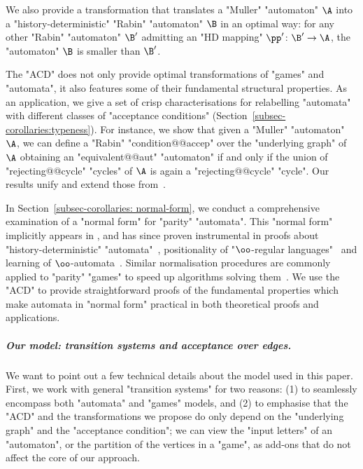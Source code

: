 \documentclass[10pt,a4paper]{amsart}
\newenvironment{longdescription} %
{\begin{description}[style=unboxed]}
	{\end{description}}
\begin{document}
\begin{longdescription}
	We also provide a transformation that translates a "Muller" "automaton" $\A$ into a "history-deterministic" "Rabin" "automaton" $\B$ in an optimal way: for any other "Rabin" "automaton" $\B'$ admitting an "HD mapping" $\pp'\colon \B'\to \A$, the "automaton" $\B$ is smaller than $\B'$.
	
	\item[4. Structural results for Muller transition systems.] The "ACD" does not only provide optimal transformations of "games" and "automata", it also features some of their fundamental structural properties. 
	As an application, we give a set of crisp characterisations for relabelling "automata" with different classes of "acceptance conditions" (Section~\ref{subsec-corollaries:typeness}). For instance,  we show that given a "Muller" "automaton" $\A$, we can define a "Rabin" "condition@@accep" over the "underlying graph" of $\A$ obtaining an "equivalent@@aut" "automaton" if and only if the union of "rejecting@@cycle" "cycles" of $\A$ is again a "rejecting@@cycle" "cycle". Our results unify and extend those from~\cite{BSW01Weakautomata,BKS10Paritizing,KPB94DetOmega,Zielonka1998infinite}.
	
	In Section~\ref{subsec-corollaries: normal-form}, we conduct a comprehensive examination of a "normal form" for "parity" "automata". This "normal form" implicitly appears in \cite{CartonMaceiras99RabinIndex}, and has since proven instrumental in proofs about "history-deterministic" "automata"~\cite{AK22MinimizingGFG,EhlersSchewe22NaturalColors,KS15DeterminisationGFG}, positionality of "$\oo$-regular languages"~\cite{BCRV22HalfPosBuchi} and learning of $\oo$-automata~\cite{BohnLoding23DetParityFromExamples}. Similar normalisation procedures are commonly applied to "parity" "games" to speed up algorithms solving them~\cite{FriedmannM09ParityGames}. We use the "ACD" to provide straightforward proofs of the fundamental properties which make automata in "normal form" practical in both theoretical proofs and applications.	
\end{longdescription}


\subparagraph*{Our model: transition systems and acceptance over edges.} We want to point out a few technical details about the model used in this paper. First, we work with general "transition systems" for two reasons: (1) to seamlessly encompass both "automata" and "games" models, and (2) to emphasise that the "ACD" and the transformations we propose do only depend on the "underlying graph" and the "acceptance condition"; we can view the "input letters" of an "automaton", or the partition of the vertices in a "game", as add-ons that do not affect the core of our approach.
\end{document}

